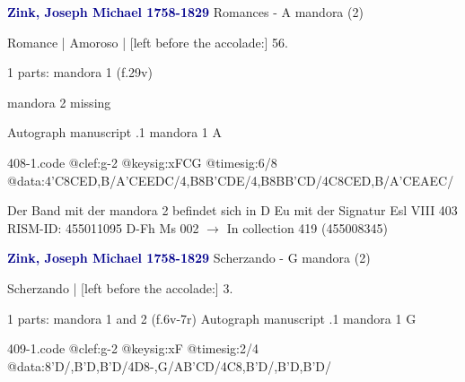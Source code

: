 \documentclass[twocolumn]{book}
\begin{document}
\newline \par \vspace{7pt} \textcolor{darkblue}{\textbf{Zink, Joseph Michael  1758-1829}}
\newline Romances - A
\newline mandora (2)
\newline \begin{itshape}[f.29v, at left:] Romance | Amoroso | [left before the accolade:] 56.\end{itshape} 
\newline \textcolor{darkblue}{}  1 parts: mandora 1  (f.29v)
\newline \begin{small} mandora 2 missing\end{small} 
\newline Autograph manuscript
.1  mandora 1  A  
\begin{filecontents*}{408-1.code}
@clef:g-2
@keysig:xFCG
@timesig:6/8
@data:4'C8CED,B/A'CEEDC/4,B8B'CDE/4,B8BB'CD/4C8CED,B/A'CEAEC/
\end{filecontents*}
\newline
%

\newline Der Band mit der mandora 2 befindet sich in D Eu mit der Signatur Esl VIII 403
\newline RISM-ID: 455011095
\newline D-Fh  Ms 002
\newline $\rightarrow$ In collection 419 (455008345)
      
\newline \par \vspace{7pt} \textcolor{darkblue}{\textbf{Zink, Joseph Michael  1758-1829}}
\newline Scherzando - G
\newline mandora (2)
\newline \begin{itshape} Scherzando | [left before the accolade:] 3.\end{itshape} 
\newline \textcolor{darkblue}{}  1 parts: mandora 1 and 2  (f.6v-7r)
\newline Autograph manuscript
.1  mandora 1  G  
\begin{filecontents*}{409-1.code}
@clef:g-2
@keysig:xF
@timesig:2/4
@data:8'D/,B'D,B'D/4D8-,G/AB'CD/4C8,B'D/,B'D,B'D/
\end{filecontents*}
\newline
%
\end{document}
